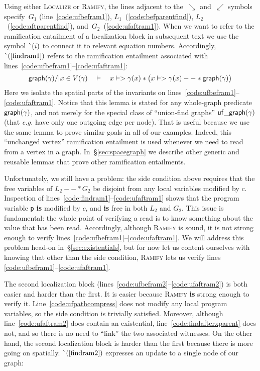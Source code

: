 Using either \textsc{Localize} or \textsc{Ramify}, the lines adjacent to 
the~$\searrow$ and~$\swarrow$ symbols specify~$G_1$ (line~\ref{code:ufbefram1}), 
$L_1$~(\ref{code:befparentfind}),
$L_2$~(\ref{code:aftparentfind}), and~$G_2$~(\ref{code:ufaftram1}). 
When we want to refer to the ramification entailment of a localization block in 
subsequent text we use the symbol $\lightning(i)$ to connect it to relevant equation 
numbers.  Accordingly, $\lightning(\ref{findram1})$ refers to the ramification entailment 
associated with lines~\ref{code:ufbefram1}--\ref{code:ufaftram1}:
\begin{equation}
\label{findram1}
\mathsf{graph}(\gamma) /| x \in V(\gamma) \quad |- \quad x |-> \gamma(x) * \big(x |-> \gamma(x) --* \mathsf{graph}(\gamma)\big)
\end{equation}
Here we isolate the spatial parts of the invariants on lines~\ref{code:ufbefram1}--\ref{code:ufaftram1}.  Notice that this lemma is stated for any whole-graph predicate $\mathsf{graph}(\gamma)$, and not merely for the special class of ``union-find graphs'' $\mathsf{uf\_graph}(\gamma)$ (that \emph{e.g.} have only one outgoing edge per node).  That is useful because we use the same lemma to prove similar goals in all of our examples.
Indeed, this ``unchanged vertex'' ramification entailment is used whenever we need to read from a vertex in a graph.  In~\S\ref{sec:spacegraph} we describe other generic and reusable lemmas that prove other ramification entailments.

Unfortunately, we still have a problem: the side condition above requires that 
the free variables of $L_2 --* G_2$ be disjoint from any local variables modified 
by $c$.  Inspection of lines~\ref{code:findram1}--\ref{code:ufaftram1} shows that the 
program variable \texttt{p} \textbf{is} modified by $c$, and \textbf{is} free in 
both $L_2$ and $G_2$.  
This issue is fundamental: the whole point of verifying 
a read is to know something about the value that has been read.  Accordingly, 
although \textsc{Ramify} is sound, it is not strong enough to verify
lines~\ref{code:ufbefram1}--\ref{code:ufaftram1}.  We will address this problem 
head-on in~\S\ref{sec:existentials}, but for now let us content ourselves with knowing 
that other than the side condition, \textsc{Ramify} lets us verify 
lines \ref{code:ufbefram1}--\ref{code:ufaftram1}.

The second localization block (lines~\ref{code:ufbefram2}--\ref{code:ufaftram2}) is both easier and harder than the first.  It is easier because \textsc{Ramify} \textbf{is} strong enough to verify it. Line~\ref{code:ufpathcompress} does not modify any local program variables, so the side condition is trivially satisfied.  Moreover, although line~\ref{code:ufaftram2} does contain an existential, line~\ref{code:findafterxparent} does not, and so there is no need to ``link'' the two associated witnesses.  On the other hand, the second localization block is harder than the first because there is more going on spatially. $\lightning(\ref{findram2})$ expresses an update to a single node of our graph:

